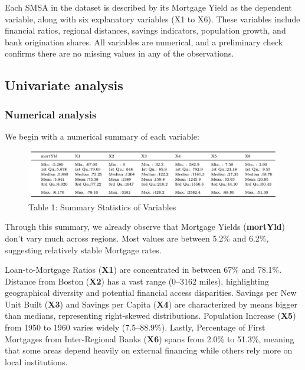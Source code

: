 \documentclass[
  12pt,
]{article}
\begin{document}
Each SMSA in the dataset is described by its Mortgage Yield as the
dependent variable, along with six explanatory variables (X1 to X6).
These variables include financial ratios, regional distances, savings
indicators, population growth, and bank origination shares. All
variables are numerical, and a preliminary check confirms there are no
missing values in any of the observations.

\subsection{Univariate analysis}\label{univariate-analysis}

\subsubsection{Numerical analysis}\label{numerical-analysis}

We begin with a numerical summary of each variable:

\vspace{-0.5cm}
\begin{figure}[H]
\centering
\includegraphics[width=1.0\textwidth]{figures/Table 1.png}
\captionsetup{font=normalsize}
\caption*{Table 1: Summary Statistics of Variables}
\end{figure}
\vspace{-0.5cm}

Through this summary, we already observe that Mortgage Yields
(\textbf{mortYld}) don't vary much across regions. Most values are
between 5.2\% and 6.2\%, suggesting relatively stable Mortgage rates.

Loan-to-Mortgage Ratios (\textbf{X1}) are concentrated in between 67\%
and 78.1\%. Distance from Boston (\textbf{X2}) has a vast range (0--3162
miles), highlighting geographical diversity and potential financial
access disparities. Savings per New Unit Built (\textbf{X3}) and Savings
per Capita (\textbf{X4}) are characterized by means bigger than medians,
representing right-skewed distributions. Population Increase
(\textbf{X5}) from 1950 to 1960 varies widely (7.5--88.9\%). Lastly,
Percentage of First Mortgages from Inter-Regional Banks (\textbf{X6})
spans from 2.0\% to 51.3\%, meaning that some areas depend heavily on
external financing while others rely more on local institutions.
\end{document}
